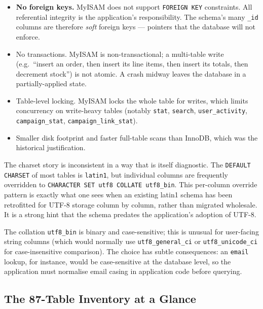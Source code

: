 \documentclass[11pt,a4paper]{article}
\begin{document}
\begin{itemize}[leftmargin=1.6em,itemsep=2pt]
  \item \textbf{No foreign keys.} MyISAM does not support
        \texttt{FOREIGN KEY} constraints. All referential integrity is the
        application's responsibility. The schema's many \texttt{\_id}
        columns are therefore \emph{soft} foreign keys --- pointers that
        the database will not enforce.
  \item No transactions. MyISAM is non-transactional; a multi-table write
        (e.g.\ ``insert an order, then insert its line items, then insert
        its totals, then decrement stock'') is not atomic. A crash midway
        leaves the database in a partially-applied state.
  \item Table-level locking. MyISAM locks the whole table for writes,
        which limits concurrency on write-heavy tables (notably
        \texttt{stat}, \texttt{search}, \texttt{user\_activity},
        \texttt{campaign\_stat}, \texttt{campaign\_link\_stat}).
  \item Smaller disk footprint and faster full-table scans than InnoDB,
        which was the historical justification.
\end{itemize}

The charset story is inconsistent in a way that is itself diagnostic. The
\texttt{DEFAULT CHARSET} of most tables is \texttt{latin1}, but individual
columns are frequently overridden to \texttt{CHARACTER SET utf8 COLLATE
utf8\_bin}. This per-column override pattern is exactly what one sees when
an existing latin1 schema has been retrofitted for UTF-8 storage column by
column, rather than migrated wholesale. It is a strong hint that the schema
predates the application's adoption of UTF-8.

The collation \texttt{utf8\_bin} is binary and case-sensitive; this is
unusual for user-facing string columns (which would normally use
\texttt{utf8\_general\_ci} or \texttt{utf8\_unicode\_ci} for
case-insensitive comparison). The choice has subtle consequences: an
\texttt{email} lookup, for instance, would be case-sensitive at the
database level, so the application must normalise email casing in
application code before querying.

\subsection{The 87-Table Inventory at a Glance}
\end{document}
